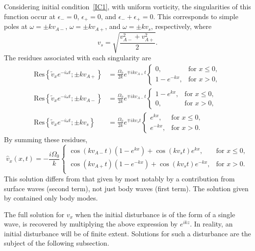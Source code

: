 Considering initial condition~\ref{IC1}, with uniform vorticity, the singularities of this function occur at $\epsilon_- = 0$, $\epsilon_+ = 0$, and $\epsilon_- + \epsilon_+ = 0$. This corresponds to simple poles at $\omega = \pm kv_{A-}$, $\omega = \pm kv_{A+}$, and $\omega = \pm kv_s$, respectively, where
\begin{equation}
v_s = \sqrt{\frac{v_{A-}^2 + v_{A+}^2}{2}}.
\end{equation}
The residues associated with each singularity are
\begin{align}
\mathrm{Res}\left\{\tilde{v}_x e^{-i\omega t}; \pm kv_{A+}\right\} &= \frac{\Omega_0}{2k} e^{\mp ikv_{A+}t}
\begin{cases}
0, & \text{for  } x \leq 0, \\
1 - e^{-kx}, & \text{for  } x > 0, 
\end{cases} \\
\mathrm{Res}\left\{\tilde{v}_x e^{-i\omega t}; \pm kv_{A-}\right\} &= \frac{\Omega_0}{2k} e^{\mp ikv_{A-}t}
\begin{cases}
1 - e^{kx}, & \text{for  } x \leq 0, \\
0, & \text{for  } x > 0,
\end{cases} \\
\mathrm{Res}\left\{\tilde{v}_x e^{-i\omega t}; \pm kv_{s}\right\} &= \frac{\Omega_0}{2k} e^{\mp ikv_st} 
\begin{cases}
e^{kx}, & \text{for  } x \leq 0, \\
e^{-kx}, & \text{for  } x > 0.
\end{cases}
\end{align}
By summing these residues,
\begin{equation}
\widehat{v}_x(x, t) = -\frac{i\Omega_0}{k} \begin{cases}
\cos(kv_{A-}t)\left(1-e^{kx}\right) + \cos(kv_st)e^{kx}, & \text{for  } x \leq 0, \\
\cos(kv_{A+}t)\left(1-e^{-kx}\right) + \cos(kv_st)e^{-kx}, & \text{for  } x > 0. \\
\end{cases}
\label{sol int}
\end{equation}
This solution differs from that given by \cite{rae_etal81} most notably by a contribution from surface waves (second term), not just body waves (first term). The solution given by \cite{rae_etal81} contained only body modes.

The full solution for $v_x$ when the initial disturbance is of the form of a single wave, is recovered by multiplying the above expression by $e^{ikz}$. In reality, an initial disturbance will be of finite extent. Solutions for such a disturbance are the subject of the following subsection.


